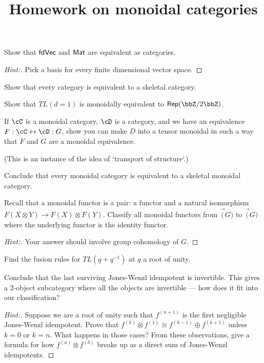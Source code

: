 \documentclass[11pt]{article}
\begin{document}
\title{Homework on monoidal categories}
\maketitle

\begin{exercise} 
Show that $\mathsf{fdVec}$ and $\mathsf{Mat}$ are equivalent as categories.
\end{exercise}
\begin{proof}[Hint:]
Pick a basis for every finite dimensional vector space.
\end{proof}

\begin{exercise}
Show that every category is equivalent to a skeletal category.
\end{exercise}

\begin{exercise}
Show that $TL(d=1)$ is monoidally equivalent to $\Rep(\bbZ / 2 \bbZ)$.
\end{exercise}

\begin{exercise}
If $\cC$ is a monoidal category, $\cD$ is a category, and we have an equivalence $F:\cC \leftrightarrow \cD:G$, show you can make $D$ into a tensor monoidal in such a way that $F$ and $G$ are a monoidal equivalence.
\end{exercise}
(This is an instance of the idea of `transport of structure`.)

\begin{exercise}
Conclude that every monoidal category is equivalent to a skeletal monoidal category. 
\end{exercise}

\begin{exercise}
Recall that a monoidal functor is a pair: a functor and a natural isomorphism $F(X \otimes Y) \to F(X) \otimes F(Y)$.  Classify all monoidal functors from $\Vec(G)$ to $\Vec(G)$ where the underlying functor is the identity functor. 
\end{exercise}
\begin{proof}[Hint:]
Your answer should involve group cohomology of $G$.
\end{proof}

\begin{exercise}
Find the fusion rules for $TL(q+q^{-1})$ at $q$ a root of unity.

Conclude that the last surviving Jones-Wenzl idempotent is invertible.  This gives a 2-object subcategory where all the objects are invertible --- how does it fit into our classification?
\end{exercise}
\begin{proof}[Hint:]
Suppose we are a root of unity such that $f^{(n+1)}$ is the first negligible Jones-Wenzl idempotent. Prove that $f^{(k)} \otimes f^{(1)} \cong f^{(k-1)} \oplus f^{(k+1)}$ unless $k=0$ or $k=n$. What happens in those cases? From these observations, give a formula for how $f^{(a)} \otimes f^{(b)}$ breaks up as a direct sum of Jones-Wenzl idempotents.
\end{proof}
\end{document}
